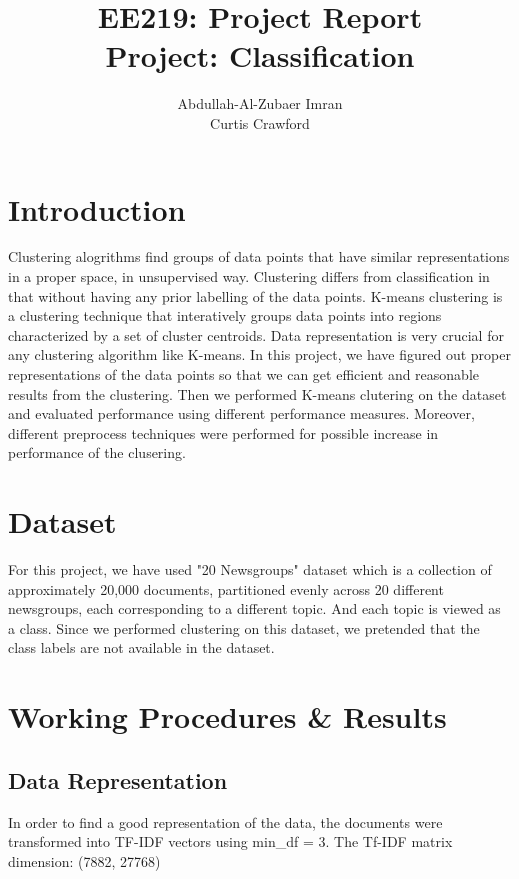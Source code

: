 \documentclass{article}
\author{Abdullah-Al-Zubaer Imran\\Curtis Crawford}
\title{EE219: Project Report \\ Project: Classification}
\date{}
\begin{document}
\maketitle

\section{Introduction}
Clustering alogrithms find groups of data points that have similar representations in a proper space, in unsupervised way. Clustering differs from classification in that without having any prior labelling of the data points. K-means clustering is a clustering technique that interatively groups data points into regions characterized by a set of cluster centroids. Data representation is very crucial for any clustering algorithm like K-means. In this project, we have figured out proper representations of the data points so that we can get efficient and reasonable results from the clustering. Then we performed K-means clutering on the dataset and evaluated performance using different performance measures. Moreover, different preprocess techniques were performed for possible increase in performance of the clusering. \\

\section{Dataset}
For this project, we have used "20 Newsgroups" dataset which is a collection of approximately 20,000 documents, partitioned evenly across 20 different newsgroups, each corresponding to a different topic. And each topic is viewed as a class. Since we performed clustering on this dataset, we pretended that the class labels are not available in the dataset. \\ 



\section{Working Procedures \& Results}

\subsection{Data Representation}
In order to find a good representation of the data, the documents were transformed into TF\--IDF vectors using min\_df = 3.
The Tf\--IDF matrix dimension: (7882, 27768) 
\end{document}
